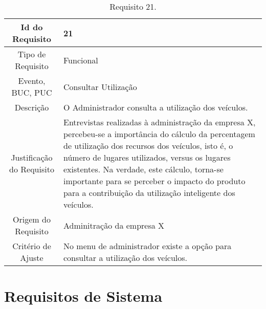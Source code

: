 \begin{table}[H]
\begin{center}
  \begin{tabularx}{\textwidth}{ | c | X | }
    \hline
    Id do Requisito & 21  \\
    
    \hline
    Tipo de Requisito & Funcional \\
    
    \hline
    Evento, BUC, PUC &  Consultar Utilização\\
    
    \hline
    Descrição & O Administrador consulta a utilização dos veículos.\\
    
    \hline
    Justificação do Requisito & Entrevistas realizadas à administração da empresa X, percebeu-se a importância do cálculo da percentagem de utilização dos recursos dos veículos, isto é, o número de lugares utilizados, versus os lugares existentes. Na verdade, este cálculo, torna-se importante para se perceber o impacto do produto para a contribuição da utilização inteligente dos veículos. \\
    
    \hline
    Origem do Requisito & Adminitração da empresa X\\
    
    \hline
    Critério de Ajuste & No menu de administrador existe a opção para consultar a utilização dos veículos.  \\
    
    \hline
  \end{tabularx}
  \caption{Requisito 21.} \label{tab:r3}
\end{center}
\end{table}



\section{Requisitos de Sistema}

